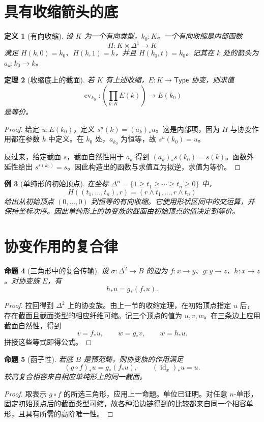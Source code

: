 \documentclass[12pt,oneside,openany,fontset=none]{ctexbook}
\theoremstyle{cn}
\newtheorem{definition}{定义}[chapter]
\newtheorem{example}[definition]{例}
\newtheorem{proposition}[definition]{命题}
\newtheorem{theorem}[definition]{定理}
\numberwithin{equation}{chapter}
\newcommand{\id}{\operatorname{id}}
\newcommand{\ev}{\operatorname{ev}}
\begin{document}
\section{具有收缩箭头的底}
\begin{definition}[有向收缩]
设 $K$ 为一个有向类型，$k_0:K$。一个有向收缩是内部函数
\[
H:K\times\Delta^1\to K
\]
满足 $H(k,0)=k_0$、$H(k,1)=k$，并且 $H(k_0,t)=k_0$。记其在 $k$ 处的箭头为 $a_k:k_0\to k$。
\end{definition}
\begin{theorem}[收缩底上的截面]\label{thm:directed-contraction}
若 $K$ 有上述收缩，$E:K\to\mathsf{Type}$ 协变，则求值
\[
\ev_{k_0}:\left(\prod_{k:K}E(k)\right)\to E(k_0)
\]
是等价。
\end{theorem}
\begin{proof}
给定 $u:E(k_0)$，定义 $s^u(k)=(a_k)_*u$。这是内部项，因为 $H$ 与协变作用都在参数 $k$ 中定义。在 $k_0$ 处，$a_{k_0}$ 为恒等，故 $s^u(k_0)=u$。

反过来，给定截面 $s$，截面自然性用于 $a_k$ 得到
$(a_k)_*s(k_0)=s(k)$。函数外延性给出 $s^{s(k_0)}=s$。因此构造出的函数与求值互为拟逆，求值为等价。
\end{proof}
\begin{example}[单纯形的初始顶点]
在坐标 $\Delta^n=\{1\ge t_1\ge\cdots\ge t_n\ge0\}$ 中，
\[
H((t_1,\ldots,t_n),r)
=(r\wedge t_1,\ldots,r\wedge t_n)
\]
给出从初始顶点 $(0,\ldots,0)$ 到恒等的有向收缩。它使用形状区间中的交运算，并保持坐标次序。因此单纯形上的协变族的截面由初始顶点的值决定到等价。
\end{example}

\section{协变作用的复合律}
\begin{proposition}[三角形中的复合传输]
设 $\sigma:\Delta^2\to B$ 的边为 $f:x\to y$、$g:y\to z$、$h:x\to z$。对协变族 $E$，有
\[
h_*u=g_*(f_*u).
\]
\end{proposition}
\begin{proof}
拉回得到 $\Delta^2$ 上的协变族。由上一节的收缩定理，在初始顶点指定 $u$ 后，存在截面且截面类型的相应纤维可缩。记三个顶点的值为 $u,v,w$。在三条边上应用截面自然性，得到
\[
v=f_*u,\qquad w=g_*v,\qquad w=h_*u.
\]
拼接这些等式即得公式。
\end{proof}
\begin{proposition}[函子性]
若底 $B$ 是预范畴，则协变族的作用满足
\[
(g\circ f)_*u=g_*(f_*u),
\qquad(\id_x)_*u=u.
\]
较高复合相容来自相应单纯形上的同一截面。
\end{proposition}
\begin{proof}
取表示 $g\circ f$ 的所选三角形，应用上一命题。单位已证明。对任意 $n$-单形，固定初始顶点后的截面类型可缩，故各种沿边链得到的比较都来自同一个相容单形，且具有所需的高阶唯一性。
\end{proof}
\end{document}
